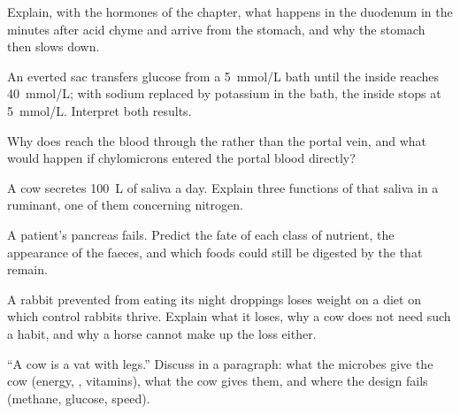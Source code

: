\begin{exercise}[$\star\star$]\label{exo:b1:digestion-absorption:6}
Explain, with the hormones of the chapter, what happens in the
duodenum in the minutes after acid chyme and  arrive from the
stomach, and why the stomach then slows down.
\end{exercise}

\begin{exercise}[$\star\star$]\label{exo:b1:digestion-absorption:7}
An everted sac transfers glucose from a \qty{5}{mmol/L} bath until
the inside reaches \qty{40}{mmol/L}; with sodium replaced by potassium
in the bath, the inside stops at \qty{5}{mmol/L}. Interpret both
results.
\end{exercise}

\begin{exercise}[$\star\star$]\label{exo:b1:digestion-absorption:8}
Why does  reach the blood through the  rather than the portal
vein, and what would happen if chylomicrons entered the portal blood
directly?
\end{exercise}

\begin{exercise}[$\star\star$]\label{exo:b1:digestion-absorption:9}
A cow secretes \qty{100}{L} of saliva a day. Explain three functions
of that saliva in a ruminant, one of them concerning nitrogen.
\end{exercise}

\begin{exercise}[$\star\star\star$]\label{exo:b1:digestion-absorption:10}
A patient's pancreas fails. Predict the fate of each class of
nutrient, the appearance of the faeces, and which foods could still be
digested by the  that remain.
\end{exercise}

\begin{exercise}[$\star\star\star$]\label{exo:b1:digestion-absorption:11}
A rabbit prevented from eating its night droppings loses weight on a
diet on which control rabbits thrive. Explain what it loses, why a cow
does not need such a habit, and why a horse cannot make up the loss
either.
\end{exercise}

\begin{exercise}[$\star\star\star$]\label{exo:b1:digestion-absorption:12}
``A cow is a  vat with legs.'' Discuss in a paragraph: what
the microbes give the cow (energy, , vitamins), what the cow
gives them, and where the design fails (methane, glucose, speed).
\end{exercise}

